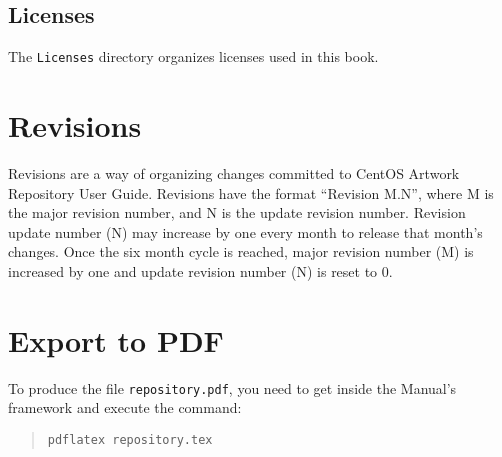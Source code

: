 \subsection{Licenses} 

The \texttt{Licenses} directory organizes licenses used in this book.

\section{Revisions}
\hypertarget{sec:Concepts:Manuals:Revisions}{}
\label{sec:Concepts:Manuals:Revisions}

Revisions are a way of organizing changes committed to CentOS Artwork
Repository User Guide. Revisions have the format ``Revision M.N'',
where M is the major revision number, and N is the update revision
number.  Revision update number (N) may increase by one every month to
release that month's changes.  Once the six month cycle is reached,
major revision number (M) is increased by one and update revision
number (N) is reset to 0.

\section{Export to PDF}

To produce the file \texttt{repository.pdf}, you need to get inside
the Manual's framework and execute the command:

\begin{quote}
\texttt{pdflatex repository.tex}
\end{quote}
